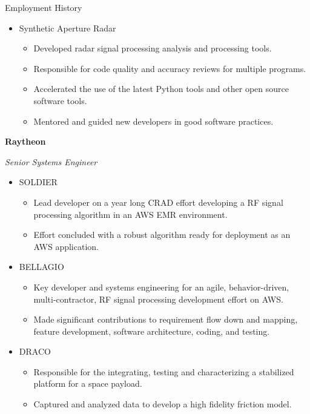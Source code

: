 \begin{rubric}{Employment History}
\begin{itemize}[nosep]
\begin{itemize}[nosep]
        \end{itemize}
        \item Synthetic Aperture Radar
        \begin{itemize}[nosep]
            \item Developed radar signal processing analysis and processing tools.
            \item Responsible for code quality and accuracy reviews for multiple programs.
            \item Accelerated the use of the latest Python tools and other open source software tools.
            \item Mentored and guided new developers in good software practices.
        \end{itemize}
    \end{itemize}
%
\entry*[11/14 -- 07/20]%
    \textbf{Raytheon}\par
    \textit{Senior Systems Engineer}\par
    \begin{itemize}[nosep]
        \item SOLDIER
        \begin{itemize}[nosep]
            \item Lead developer on a year long CRAD effort developing a RF signal processing algorithm in an AWS EMR environment.
            \item Effort concluded with a robust algorithm ready for deployment as an AWS application.
        \end{itemize}
        \item BELLAGIO
        \begin{itemize}[nosep]
            \item Key developer and systems engineering for an agile, behavior-driven, multi-contractor, RF signal processing development effort on AWS.
            \item Made significant contributions to requirement flow down and mapping, feature development, software architecture, coding, and testing.
        \end{itemize}
        \item DRACO
        \begin{itemize}[nosep]
            \item Responsible for the integrating, testing and characterizing a stabilized platform for a space payload.
            \item Captured and analyzed data to develop a high fidelity friction model.

\end{itemize}
\end{itemize}
\end{rubric}
